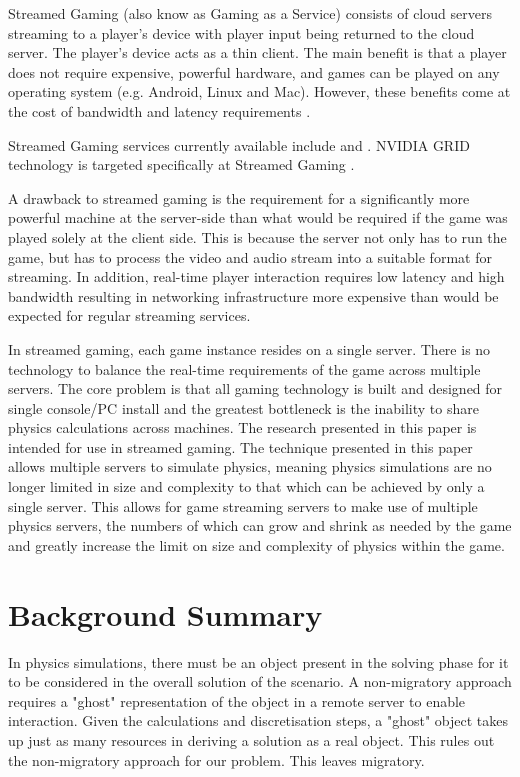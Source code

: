Streamed Gaming (also know as Gaming as a Service) consists of cloud servers streaming to a player's device with player input being returned to the cloud server. The player's device acts as a thin client. The main benefit is that a player does not require expensive, powerful hardware, and games can be played on any operating system (e.g. Android, Linux and Mac). However, these benefits come at the cost of bandwidth and latency requirements \cite{iCloudAccess}.

Streamed Gaming services currently available include \cite{NVidiaGameStream} and \cite{PSNOW}. NVIDIA GRID technology is targeted specifically at Streamed Gaming \cite{NVIDIACloud}.

A drawback to streamed gaming is the requirement for a significantly more powerful machine at the server-side than what would be required if the game was played solely at the client side. This is because the server not only has to run the game, but has to process the video and audio stream into a suitable format for streaming. In addition, real-time player interaction requires low latency and high bandwidth resulting in networking infrastructure more expensive than would be expected for regular streaming services. 

In streamed gaming, each game instance resides on a single server. There is no technology to balance the real-time requirements of the game across multiple servers. The core problem is that all gaming technology is built and designed for single console/PC install and the greatest bottleneck is the inability to share physics calculations across machines. The research presented in this paper is intended for use in streamed gaming. The technique presented in this paper allows multiple servers to simulate physics, meaning physics simulations are no longer limited in size and complexity to that which can be achieved by only a single server. This allows for game streaming servers to make use of multiple physics servers, the numbers of which can grow and shrink as needed by the game and greatly increase the limit on size and complexity of physics within the game.

\section{Background Summary}
In physics simulations, there must be an object present in the solving phase for it to be considered in the overall solution of the scenario. A non-migratory approach requires a "ghost" representation of the object in a remote server to enable interaction. Given the calculations and discretisation steps, a "ghost" object takes up just as many resources in deriving a solution as a real object. This rules out the non-migratory approach for our problem. This leaves migratory.

